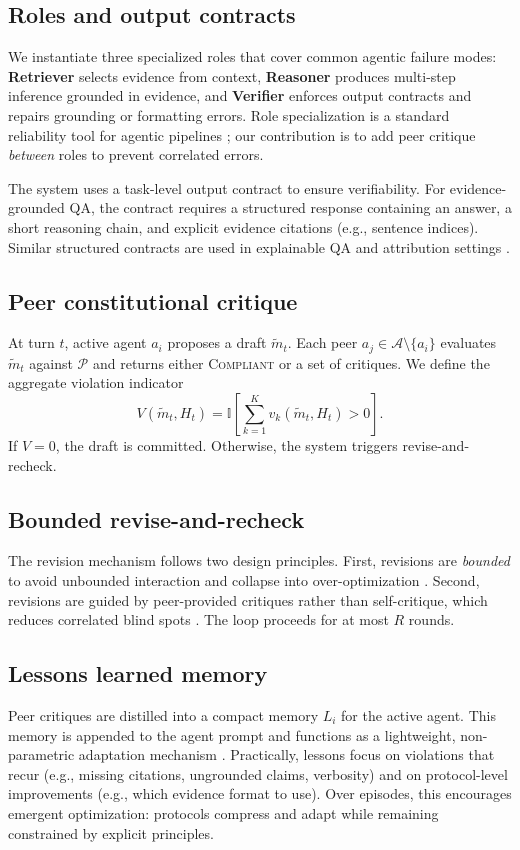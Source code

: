 \documentclass{article}
\theoremstyle{plain}
\theoremstyle{definition}
\begin{document}
\subsection{Roles and output contracts}
We instantiate three specialized roles that cover common agentic failure modes:
\textbf{Retriever} selects evidence from context, \textbf{Reasoner} produces multi-step inference grounded in evidence, and \textbf{Verifier} enforces output contracts and repairs grounding or formatting errors. Role specialization is a standard reliability tool for agentic pipelines \citep{yao2023react,shinn2023reflexion}; our contribution is to add peer critique \emph{between} roles to prevent correlated errors.

The system uses a task-level output contract to ensure verifiability. For evidence-grounded QA, the contract requires a structured response containing an answer, a short reasoning chain, and explicit evidence citations (e.g., sentence indices). Similar structured contracts are used in explainable QA and attribution settings \citep{yang2018hotpotqa,thorne2018fever}.

\subsection{Peer constitutional critique}
At turn $t$, active agent $a_i$ proposes a draft $\tilde{m}_t$. Each peer $a_j\in\mathcal{A}\setminus\{a_i\}$ evaluates $\tilde{m}_t$ against $\mathcal{P}$ and returns either \textsc{Compliant} or a set of critiques. We define the aggregate violation indicator
\begin{equation}
V(\tilde{m}_t,H_t)=\mathbb{I}\left[\sum_{k=1}^{K} v_k(\tilde{m}_t,H_t) > 0\right].
\end{equation}
If $V=0$, the draft is committed. Otherwise, the system triggers revise-and-recheck.

\subsection{Bounded revise-and-recheck}
The revision mechanism follows two design principles. First, revisions are \emph{bounded} to avoid unbounded interaction and collapse into over-optimization \citep{madaan2023selfrefine}. Second, revisions are guided by peer-provided critiques rather than self-critique, which reduces correlated blind spots \citep{du2024debate,chan2023chateval}. The loop proceeds for at most $R$ rounds.

\subsection{Lessons learned memory}
Peer critiques are distilled into a compact memory $L_i$ for the active agent. This memory is appended to the agent prompt and functions as a lightweight, non-parametric adaptation mechanism \citep{shinn2023reflexion}. Practically, lessons focus on violations that recur (e.g., missing citations, ungrounded claims, verbosity) and on protocol-level improvements (e.g., which evidence format to use). Over episodes, this encourages emergent optimization: protocols compress and adapt while remaining constrained by explicit principles.
\end{document}
